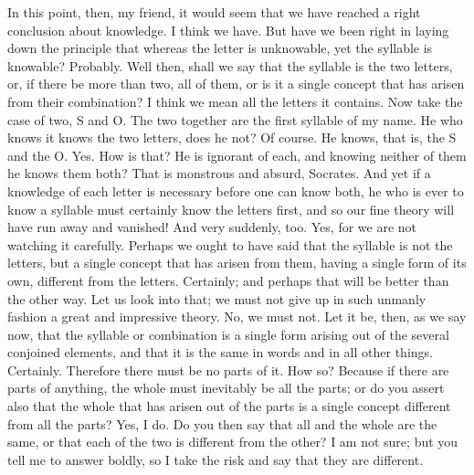 \documentclass[letterpaper,12pt]{article}
\newcommand{\stephpag}[1]{\marginnote{\small\itshape\fontfamily{ppl}\selectfont #1}}
\begin{document}
\begin{drama}
\socratesspeaks
In this point, then, my friend, it would seem that we have reached a right conclusion about knowledge.
\theaetetusspeaks
I think we have. \stephpag{c}
\socratesspeaks
But have we been right in laying down the principle that whereas the letter is unknowable, yet the syllable is knowable?
\theaetetusspeaks
Probably.
\socratesspeaks
Well then, shall we say that the syllable is the two letters, or, if there be more than two, all of them, or is it a single concept that has arisen from their combination?
\theaetetusspeaks
I think we mean all the letters it contains.
\socratesspeaks
Now take the case of two, S and O. The two together are the first syllable of my name. He who knows it knows the two letters, does he not? \stephpag{d}
\theaetetusspeaks
Of course.
\socratesspeaks
He knows, that is, the S and the O.
\theaetetusspeaks
Yes.
\socratesspeaks
How is that? He is ignorant of each, and knowing neither of them he knows them both?
\theaetetusspeaks
That is monstrous and absurd, Socrates.
\socratesspeaks
And yet if a knowledge of each letter is necessary before one can know both, he who is ever to know a syllable must certainly know the letters first, and so our fine theory will have run away and vanished! \stephpag{e}
\theaetetusspeaks
And very suddenly, too.
\socratesspeaks
Yes, for we are not watching it carefully. Perhaps we ought to have said that the syllable is not the letters, but a single concept that has arisen from them, having a single form of its own, different from the letters.
\theaetetusspeaks
Certainly; and perhaps that will be better than the other way.
\socratesspeaks
Let us look into that; we must not give up in such unmanly fashion a great and impressive theory.
\theaetetusspeaks
No, we must not. \stephpag{204 a}
\socratesspeaks
Let it be, then, as we say now, that the syllable or combination is a single form arising out of the several conjoined elements, and that it is the same in words and in all other things.
\theaetetusspeaks
Certainly.
\socratesspeaks
Therefore there must be no parts of it.
\theaetetusspeaks
How so?
\socratesspeaks
Because if there are parts of anything, the whole must inevitably be all the parts; or do you assert also that the whole that has arisen out of the parts is a single concept different from all the parts?
\theaetetusspeaks
Yes, I do.
\socratesspeaks
Do you then say that all and the whole are the same, \stephpag{b} or that each of the two is different from the other?
\theaetetusspeaks
I am not sure; but you tell me to answer boldly, so I take the risk and say that they are different.
\socratesspeaks

\end{drama}
\end{document}
